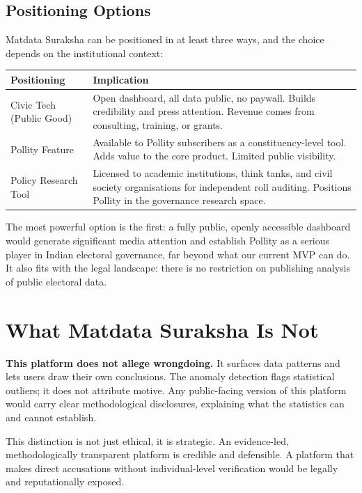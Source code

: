 \documentclass[11pt, a4paper]{article}
\begin{document}
\subsection{Positioning Options}

Matdata Suraksha can be positioned in at least three ways, and the choice depends on the institutional context:

\begin{tabularx}{\linewidth}{lX}
\toprule
\textbf{Positioning} & \textbf{Implication} \\
\midrule
Civic Tech (Public Good) & Open dashboard, all data public, no paywall. Builds credibility and press attention. Revenue comes from consulting, training, or grants. \\[4pt]
Pollity Feature          & Available to Pollity subscribers as a constituency-level tool. Adds value to the core product. Limited public visibility. \\[4pt]
Policy Research Tool     & Licensed to academic institutions, think tanks, and civil society organisations for independent roll auditing. Positions Pollity in the governance research space. \\
\bottomrule
\end{tabularx}

\vspace{0.5em}

The most powerful option is the first: a fully public, openly accessible dashboard would generate significant media attention and establish Pollity as a serious player in Indian electoral governance, far beyond what our current MVP can do. It also fits with the legal landscape: there is no restriction on publishing analysis of public electoral data.

\section{What Matdata Suraksha Is Not}

\begin{tcolorbox}[colback=alertred!6, colframe=alertred, sharp corners, boxrule=0.6pt]
\textbf{This platform does not allege wrongdoing.} It surfaces data patterns and lets users draw their own conclusions. The anomaly detection flags statistical outliers; it does not attribute motive. Any public-facing version of this platform would carry clear methodological disclosures, explaining what the statistics can and cannot establish.

This distinction is not just ethical, it is strategic. An evidence-led, methodologically transparent platform is credible and defensible. A platform that makes direct accusations without individual-level verification would be legally and reputationally exposed.
\end{tcolorbox}
\end{document}
